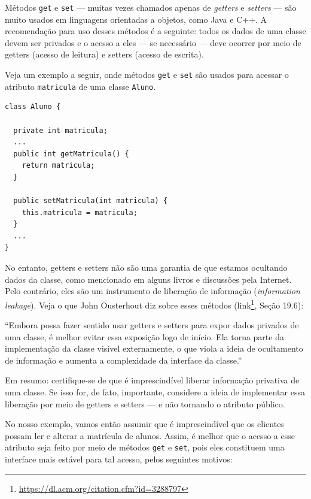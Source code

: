 \documentclass[
  11pt,
  twoside]{book}
\newcommand{\passthrough}[1]{#1}
\DeclareRobustCommand{\href}[2]{#2\footnote{\url{#1}}}
\renewenvironment{quote}{\centering \vspace{1.5ex} \begin{tcolorbox}[colback=backcolor, width=4.9in]}{\end{tcolorbox}}
\begin{document}
 

Métodos \passthrough{\lstinline!get!} e \passthrough{\lstinline!set!}
--- muitas vezes chamados apenas de \emph{getters} e \emph{setters} ---
são muito usados em linguagens orientadas a objetos, como Java e C++. A
recomendação para uso desses métodos é a seguinte: todos os dados de uma
classe devem ser privados e o acesso a eles --- se necessário --- deve
ocorrer por meio de getters (acesso de leitura) e setters (acesso de
escrita).

Veja um exemplo a seguir, onde métodos \passthrough{\lstinline!get!} e
\passthrough{\lstinline!set!} são usados para acessar o atributo
\passthrough{\lstinline!matricula!} de uma classe
\passthrough{\lstinline!Aluno!}.

\begin{lstlisting}
class Aluno {

  private int matricula;
  ...
  public int getMatricula() {
    return matricula;
  }

  public setMatricula(int matricula) {
    this.matricula = matricula;  
  }
  ...
}
\end{lstlisting}

 No entanto, getters e setters não são uma
garantia de que estamos ocultando dados da classe, como mencionado em
alguns livros e discussões pela Internet. Pelo contrário, eles são um
instrumento de liberação de informação (\emph{information leakage}).
Veja o que John Ousterhout diz sobre esses métodos
(\href{https://dl.acm.org/citation.cfm?id=3288797}{link}, Seção 19.6):

\begin{quote}
``Embora possa fazer sentido usar getters e setters para expor dados
privados de uma classe, é melhor evitar essa exposição logo de início.
Ela torna parte da implementação da classe visível externamente, o que
viola a ideia de ocultamento de informação e aumenta a complexidade da
interface da classe.''
\end{quote}

Em resumo: certifique-se de que é imprescindível liberar informação
privativa de uma classe. Se isso for, de fato, importante, considere a
ideia de implementar essa liberação por meio de getters e setters --- e
não tornando o atributo público.

No nosso exemplo, vamos então assumir que é imprescindível que os
clientes possam ler e alterar a matrícula de alunos. Assim, é melhor que
o acesso a esse atributo seja feito por meio de métodos
\passthrough{\lstinline!get!} e \passthrough{\lstinline!set!}, pois eles
constituem uma interface mais estável para tal acesso, pelos seguintes
motivos:
\end{document}
